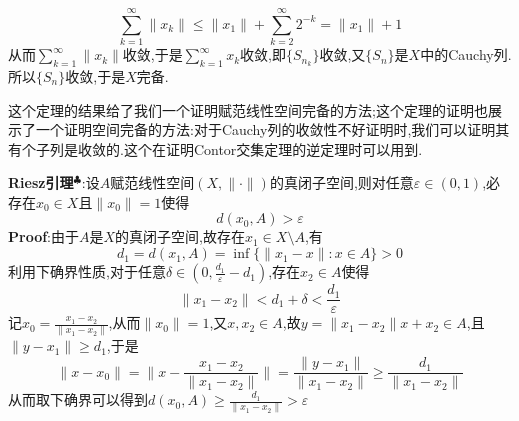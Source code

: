 $$
\sum_{k=1}^{\infty}\|x_k\|\leqslant \|x_1\|+\sum_{k=2}^{\infty}2^{-k}=\|x_1\|+1
$$
从而$\sum_{k=1}^{\infty}\|x_k\|$收敛,于是$\sum_{k=1}^{\infty}x_k$收敛,即$\{S_{n_k}\}$收敛,又$\{S_n\}$是$X$中的Cauchy列.所以$\{S_n\}$收敛,于是$X$完备.\par
这个定理的结果给了我们一个证明赋范线性空间完备的方法;这个定理的证明也展示了一个证明空间完备的方法:对于Cauchy列的收敛性不好证明时,我们可以证明其有个子列是收敛的.这个在证明Contor交集定理的逆定理时可以用到.\par
\textbf{Riesz引理}$^\clubsuit $:设$A$赋范线性空间$(X,\|\cdot\|)$的真闭子空间,则对任意$\varepsilon\in (0,1)$,必存在$x_0\in X$且$\|x_0\|=1$使得
$$
d(x_0,A)>\varepsilon
$$
\qquad \textbf{Proof}:由于$A$是$X$的真闭子空间,故存在$x_1\in X\setminus A$,有
$$
d_1=d(x_1,A)=\inf\{\|x_1-x\|:x\in A\}>0
$$
利用下确界性质,对于任意$\delta\in \left(0,\frac{d_1}{\varepsilon}-d_1\right)$,存在$x_2\in A$使得
$$
\|x_1-x_2\|<d_1+\delta<\frac{d_1}{\varepsilon}
$$
记$x_0=\frac{x_1-x_2}{\|x_1-x_2\|}$,从而$\|x_0\|=1$,又$x,x_2\in A$,故$y=\|x_1-x_2\|x+x_2\in A$,且$\|y-x_1\|\geqslant d_1$,于是
$$
\|x-x_0\|=\|x-\frac{x_1-x_2}{\|x_1-x_2\|}\|=\frac{\|y-x_1\|}{\|x_1-x_2\|}\geqslant \frac{d_1}{\|x_1-x_2\|}
$$
从而取下确界可以得到$d(x_0,A)\geqslant \frac{d_1}{\|x_1-x_2\|}>\varepsilon$
